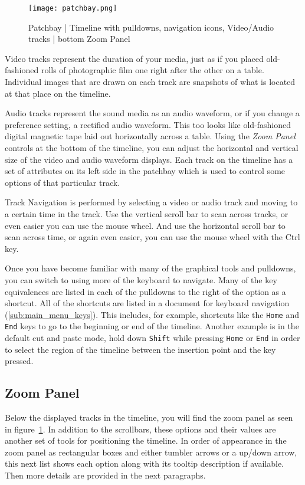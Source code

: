 \begin{figure}[htpb]
    \centering
    \texttt{[image: patchbay.png]}
    \caption{Patchbay  | Timeline with pulldowns, navigation icons, Video/Audio tracks | bottom Zoom Panel}
    \label{fig:patchbay}
\end{figure}

Video tracks represent the duration of your media, just as if you placed old-fashioned rolls of photographic
film one right after the other on a table.
Individual images that are drawn on each track are snapshots of what is located at that place on the timeline.

Audio tracks represent the sound media as an audio waveform, or if you change a preference setting, a rectified audio waveform. 
This too looks like old-fashioned digital magnetic tape laid out horizontally across a table.
Using the \textit{Zoom Panel} controls at the bottom of the timeline,
you can adjust the horizontal and vertical size of the video and audio waveform displays.
Each track on the timeline has a set of attributes on its left side in the patchbay which is used to 
control some options of that particular track. 

Track Navigation is performed by selecting a video or audio track and moving to a certain time in the track. 
Use the vertical scroll bar to scan across tracks, or even easier you can use the mouse wheel. 
And use the horizontal scroll bar to scan across time, or again even easier, you can use the mouse wheel with the Ctrl key.  

Once you have become familiar with many of the graphical tools and pulldowns, you can switch to using more of
the keyboard to navigate.  Many of the key equivalences are listed in each of the pulldowns to the right of the option
 as a shortcut. All of the shortcuts are listed in a document for keyboard 
navigation (\ref{sub:main_menu_keys}). This includes, for example, shortcuts like the \texttt{Home} and \texttt{End} keys to go to the beginning or end of the timeline.  
Another example is in the default cut and paste mode, hold down \texttt{Shift} while pressing \texttt{Home} or \texttt{End} in order to select the region of the timeline between the insertion point and the key pressed.

\subsection{Zoom Panel}%
\label{sub:zoom_panel}

Below the displayed tracks in the timeline, you will find the zoom panel as seen in figure~\ref{fig:patchbay}.
In addition to the scrollbars, these options and their values are another set of tools for positioning the timeline.  
In order of appearance in the zoom panel as rectangular boxes and either tumbler arrows or a up/down arrow, this next list shows each option along with its tooltip description if available.
Then more details are provided in the next paragraphs.

